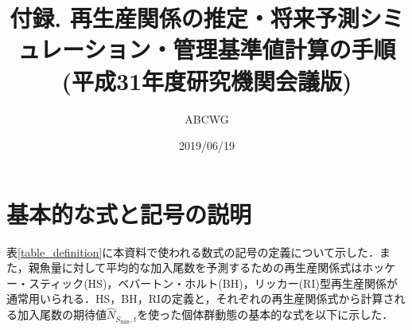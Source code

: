 \documentclass[11pt]{jsarticle}
\begin{document}
\title{付録. 再生産関係の推定・将来予測シミュレーション・管理基準値計算の手順 \\
  \Large (平成31年度研究機関会議版)
}
\author{ABCWG}
\date{2019/06/19}
\maketitle

\section{基本的な式と記号の説明}
表\ref{table_definition}に本資料で使われる数式の記号の定義について示した．また，親魚量に対して平均的な加入尾数を予測するための再生産関係式はホッケー・スティック(HS)\cite{hockey}，ベバートン・ホルト(BH)\cite{beverton}，リッカー(RI)\cite{ricker}型再生産関係が通常用いられる．HS，BH，RIの定義と，それぞれの再生産関係式から計算される加入尾数の期待値$\hat{N}_{S_{\mathrm{min}},t}$を使った個体群動態の基本的な式を以下に示した． 
\end{document}
